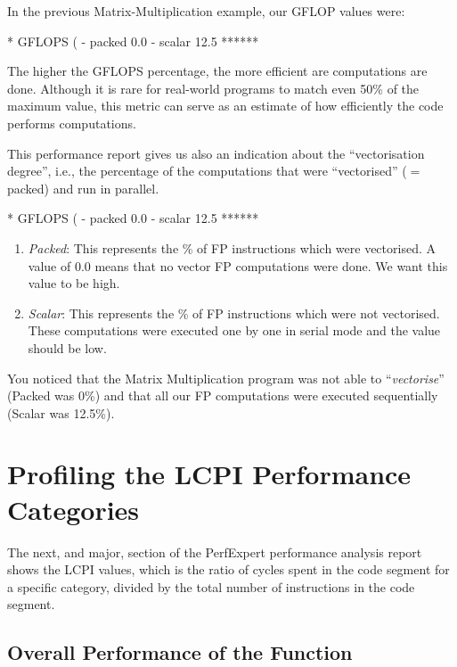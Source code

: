 In the previous Matrix-Multiplication example, our GFLOP values were:
\begin{prompt}
* GFLOPS (%
  - packed                0.0
  - scalar               12.5 ******
\end{prompt}

The higher the GFLOPS percentage, the more efficient are computations are done. Although it is rare for real-world programs to match even 50\% of the maximum value, this metric can serve as an estimate of how efficiently the code performs computations.

This performance report gives us also an indication about the ``vectorisation degree'', i.e., the percentage of the computations that were ``vectorised'' ($=$ packed) and run in parallel.

\begin{prompt}
* GFLOPS (%
  - packed                0.0
  - scalar               12.5 ******
\end{prompt}

\begin{enumerate}
  \item  \emph{Packed}: This represents the \% of FP instructions which were vectorised. A value of 0.0 means that no vector FP computations were done. We want this value to be high.
  \item  \emph{Scalar}: This represents the \% of FP instructions which were not vectorised. These computations were executed one by one in serial mode and the value should be low.
\end{enumerate}

You noticed that the Matrix Multiplication program was not able to ``\emph{vectorise}'' (Packed was 0\%) and that all our FP computations were executed sequentially (Scalar was 12.5\%).

\section{Profiling the LCPI Performance Categories}
\label{sec:Profiling_the_LCPI_Performance_Categories}

The next, and major, section of the PerfExpert performance analysis report shows the LCPI values, which is the ratio of cycles spent in the code segment for a specific category, divided by the total number of instructions in the code segment.

\subsection{Overall Performance of the Function}
\label{subsec:Overall_Performance}

